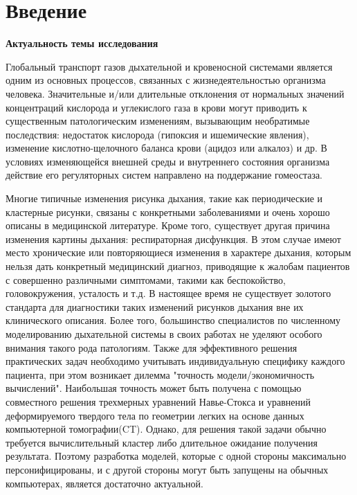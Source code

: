 \chapter*{Введение}							%

\textbf{Актуальность темы исследования} 

Глобальный транспорт газов дыхательной и кровеносной системами является одним из основных процессов, связанных с жизнедеятельностью организма человека. Значительные и/или длительные отклонения от нормальных значений концентраций кислорода и углекислого газа в крови могут приводить к существенным патологическим изменениям, вызывающим необратимые последствия: недостаток кислорода (гипоксия и ишемические явления), изменение кислотно-щелочного баланса крови (ацидоз или алкалоз) и др. В условиях изменяющейся внешней среды и внутреннего состояния организма действие его регуляторных систем направлено на поддержание гомеостаза. 

Многие типичные изменения рисунка дыхания, такие как периодические и кластерные рисунки, связаны с конкретными заболеваниями и очень хорошо описаны в медицинской литературе. Кроме того, существует другая причина изменения картины дыхания: респираторная дисфункция. В этом случае имеют место хронические или повторяющиеся изменения в характере дыхания, которым нельзя дать конкретный медицинский диагноз, приводящие к жалобам пациентов с совершенно различными симптомами, такими как беспокойство, головокружения, усталость и т.д. В настоящее время не существует золотого стандарта для диагностики таких изменений рисунков дыхания вне их клинического описания. Более того, большинство специалистов по численному моделированию дыхательной системы в своих работах не уделяют особого внимания такого рода патологиям. Также для эффективного решения практических задач необходимо учитывать индивидуальную специфику каждого пациента, при этом возникает дилемма "точность модели/экономичность вычислений". Наибольшая точность может быть получена с помощью совместного решения трехмерных уравнений Навье-Стокса и уравнений деформируемого твердого тела по геометрии легких на основе данных компьютерной томографии(CT). Однако, для решения такой задачи обычно требуется вычислительный кластер либо длительное ожидание получения результата. Поэтому разработка моделей, которые с одной стороны максимально персонифицированы, и с другой стороны могут быть запущены на обычных компьютерах, является достаточно актуальной. 

